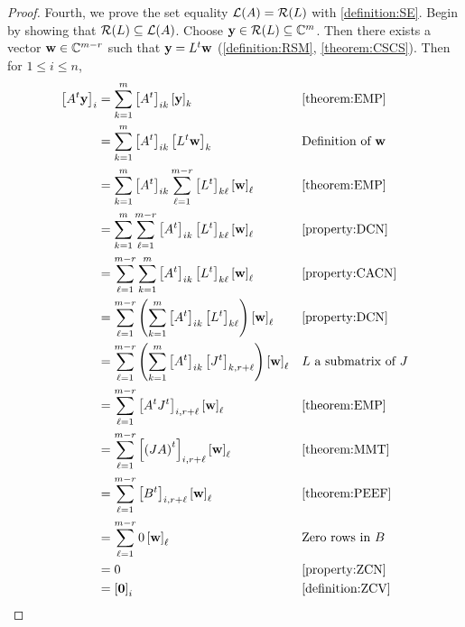 \documentclass{ximera}
\begin{document}
\begin{theorem}
\begin{proof}
  Fourth, we prove the set equality $\mathcal{L}\!\left(A\right)=\mathcal{R}\!\left(L\right)$ with
  \ref{definition:SE}.  Begin by showing that
  $\mathcal{R}\!\left(L\right)\subseteq\mathcal{L}\!\left(A\right)$.  Choose
  $\mathbf{y}\in\mathcal{R}\!\left(L\right)\subseteq\mathbb{C}^{m}$.  Then there exists a
  vector $\mathbf{w}\in\mathbb{C}^{m-r}$ such that
  $\mathbf{y}=L^{t}\mathbf{w}$ (\ref{definition:RSM},
  \ref{theorem:CSCS}).  Then for $1\leq i\leq n$,
  \begin{align*}
    \left\lbrack A^{t}\mathbf{y}\right\rbrack_{i}
    &=\sum_{k=1}^{m}\left\lbrack A^{t}\right\rbrack_{ik}\left\lbrack\mathbf{y}\right\rbrack_{k}
    &&\ref{theorem:EMP}\\
    &=\sum_{k=1}^{m}\left\lbrack A^{t}\right\rbrack_{ik}\left\lbrack L^{t}\mathbf{w}\right\rbrack_{k}
    &&\text{Definition of $\mathbf{w}$}\\
    &=\sum_{k=1}^{m}\left\lbrack A^{t}\right\rbrack_{ik}\sum_{\ell=1}^{m-r}\left\lbrack L^{t}\right\rbrack_{k\ell}\left\lbrack\mathbf{w}\right\rbrack_{\ell}
    &&\ref{theorem:EMP}\\
    &=\sum_{k=1}^{m}\sum_{\ell=1}^{m-r}\left\lbrack A^{t}\right\rbrack_{ik}\left\lbrack L^{t}\right\rbrack_{k\ell}\left\lbrack\mathbf{w}\right\rbrack_{\ell}
    &&\ref{property:DCN}\\
    &=\sum_{\ell=1}^{m-r}\sum_{k=1}^{m}\left\lbrack A^{t}\right\rbrack_{ik}\left\lbrack L^{t}\right\rbrack_{k\ell}\left\lbrack\mathbf{w}\right\rbrack_{\ell}
    &&\ref{property:CACN}\\
    &=\sum_{\ell=1}^{m-r}\left(\sum_{k=1}^{m}\left\lbrack A^{t}\right\rbrack_{ik}\left\lbrack L^{t}\right\rbrack_{k\ell}\right)\left\lbrack\mathbf{w}\right\rbrack_{\ell}
    &&\ref{property:DCN}\\
    &=\sum_{\ell=1}^{m-r}\left(\sum_{k=1}^{m}\left\lbrack A^{t}\right\rbrack_{ik}\left\lbrack J^{t}\right\rbrack_{k,r+\ell}\right)\left\lbrack\mathbf{w}\right\rbrack_{\ell}
    &&\text{$L$ a submatrix of $J$}\\
    &=\sum_{\ell=1}^{m-r}\left\lbrack A^{t}J^{t}\right\rbrack_{i,r+\ell}\left\lbrack\mathbf{w}\right\rbrack_{\ell}
    &&\ref{theorem:EMP}\\
    &=\sum_{\ell=1}^{m-r}\left\lbrack\left(JA\right)^{t}\right\rbrack_{i,r+\ell}\left\lbrack\mathbf{w}\right\rbrack_{\ell}
    &&\ref{theorem:MMT}\\
    &=\sum_{\ell=1}^{m-r}\left\lbrack B^{t}\right\rbrack_{i,r+\ell}\left\lbrack\mathbf{w}\right\rbrack_{\ell}
    &&\ref{theorem:PEEF}\\
    &=\sum_{\ell=1}^{m-r}0\left\lbrack\mathbf{w}\right\rbrack_{\ell}
    &&\text{Zero rows in $B$}\\
    &=0
    &&\ref{property:ZCN}\\
    &=\left\lbrack\mathbf{0}\right\rbrack_{i}
    &&\ref{definition:ZCV}
  \end{align*}
  

\end{proof}
\end{theorem}
\end{document}
